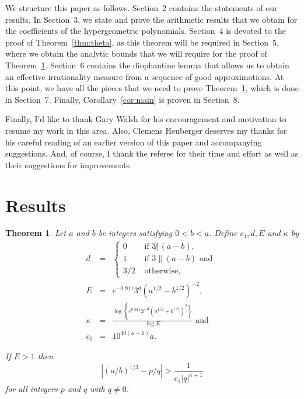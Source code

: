 \documentclass{jT}
\newtheorem{theorem}{Theorem}[section]
\theoremstyle{definition}
\begin{document}
We structure this paper as follows. Section~2 contains the statements of our results.
In Section~3, we state and prove the arithmetic results that we obtain for the 
coefficients of the hypergeometric polynomials. Section~4 is devoted to the proof
of Theorem~\ref{thm:theta}, as this theorem will be required in Section~5, where we
obtain the analytic bounds that we will require for the proof of Theorem~\ref{thm:main}.
Section~6 contains the diophantine lemma that allows us to obtain an effective
irrationality measure from a sequence of good approximations. At this point, we have
all the pieces that we need to prove Theorem~\ref{thm:main}, which is done in
Section~7. Finally, Corollary~\ref{cor:main} is proven in Section~8.

Finally, I'd like to thank Gary Walsh for his encouragement and motivation to resume
my work in this area. Also, Clemens Heuberger deserves my thanks for his careful
reading of an earlier version of this paper and accompanying suggestions. And, of
course, I thank the referee for their time and effort as well as their suggestions for
improvements.

\section{Results}

\begin{theorem}
\label{thm:main}
Let $a$ and $b$ be integers satisfying $0 < b < a$. 
Define $c_{1},d,E$ and $\kappa$ by 
\begin{eqnarray*}
d      & = & \left\{ \begin{array}{ll}
		    0   & \mbox{ if } 3 \not| \, (a-b), \\
		    1   & \mbox{ if } 3 \parallel (a-b) \mbox{ and } \\
		    3/2 & \mbox{ otherwise,}   
		\end{array}
	     \right. \\ 
E      & = & e^{-0.911} 3^{d} { \left( a^{1/2}-b^{1/2} \right) }^{-2}, \\ 
\kappa & = & \frac{\log \left\{ e^{0.911} 3^{-d} 
				{ \left( a^{1/2} + b^{1/2} \right) }^{2} 
			\right\} }
		  {\log E}
	     \mbox{ and } \\        
c_{1}  & = & 10^{40(\kappa+1)} a.
\end{eqnarray*}

If $E > 1$ then 
\begin{equation}
\label{eq:result}
\left| (a/b)^{1/3} - p/q \right| > \frac{1}{c_{1} |q|^{\kappa+1}} 
\end{equation}
for all integers $p$ and $q$ with $q \neq 0$. 
\end{theorem}
\end{document}
